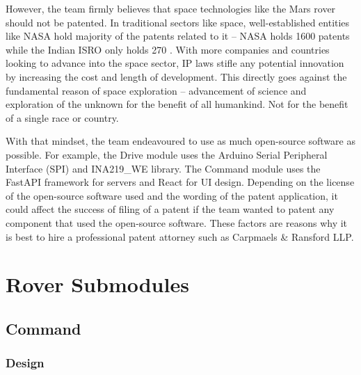 \documentclass[11pt, a4paper]{article}
\begin{document}
However, the team firmly believes that space technologies like the Mars rover should not be patented. In traditional sectors like space, well-established entities like NASA hold majority of the patents related to it – NASA holds 1600\cite{NASA_patents} patents while the Indian ISRO only holds 270 \cite{ISRO_patents}. With more companies and countries looking to advance into the space sector, IP laws stifle any potential innovation by increasing the cost and length of development. This directly goes against the fundamental reason of space exploration – advancement of science and exploration of the unknown for the benefit of all humankind. Not for the benefit of a single race or country.

With that mindset, the team endeavoured to use as much open-source software as possible. For example, the Drive module uses the Arduino  Serial Peripheral Interface (SPI) and INA219\_WE library. The Command module uses the FastAPI framework for servers and React for UI design. Depending on the license of the open-source software used and the wording of the patent application, it could affect the success of filing of a patent if the team wanted to patent any component that used the open-source software. These factors are reasons why it is best to hire a professional patent attorney such as Carpmaels \& Ransford LLP.  
 


\pagebreak



\pagebreak
\section{Rover Submodules}

\subsection{Command}

\subsubsection{Design}
\end{document}
